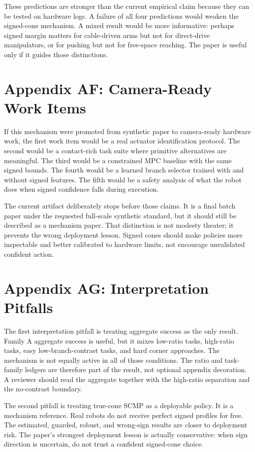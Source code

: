 \documentclass{article}
\begin{document}
These predictions are stronger than the current empirical claim because they can be tested on hardware logs. A failure of all four predictions would weaken the signed-cone mechanism. A mixed result would be more informative: perhaps signed margin matters for cable-driven arms but not for direct-drive manipulators, or for pushing but not for free-space reaching. The paper is useful only if it guides those distinctions.

\section*{Appendix AF: Camera-Ready Work Items}

If this mechanism were promoted from synthetic paper to camera-ready hardware work, the first work item would be a real actuator identification protocol. The second would be a contact-rich task suite where primitive alternatives are meaningful. The third would be a constrained MPC baseline with the same signed bounds. The fourth would be a learned branch selector trained with and without signed features. The fifth would be a safety analysis of what the robot does when signed confidence falls during execution.

The current artifact deliberately stops before those claims. It is a final batch paper under the requested full-scale synthetic standard, but it should still be described as a mechanism paper. That distinction is not modesty theater; it prevents the wrong deployment lesson. Signed cones should make policies more inspectable and better calibrated to hardware limits, not encourage unvalidated confident action.

\section*{Appendix AG: Interpretation Pitfalls}

The first interpretation pitfall is treating aggregate success as the only result. Family A aggregate success is useful, but it mixes low-ratio tasks, high-ratio tasks, easy low-branch-contrast tasks, and hard corner approaches. The mechanism is not equally active in all of those conditions. The ratio and task-family ledgers are therefore part of the result, not optional appendix decoration. A reviewer should read the aggregate together with the high-ratio separation and the no-contrast boundary.

The second pitfall is treating true-cone SCMP as a deployable policy. It is a mechanism reference. Real robots do not receive perfect signed profiles for free. The estimated, guarded, robust, and wrong-sign results are closer to deployment risk. The paper's strongest deployment lesson is actually conservative: when sign direction is uncertain, do not trust a confident signed-cone choice.
\end{document}
